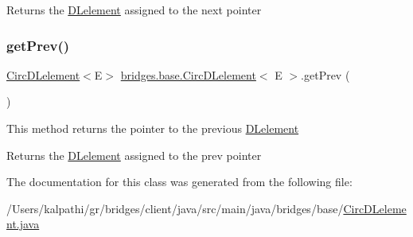 \begin{DoxyReturn}{Returns}
the \mbox{\hyperlink{classbridges_1_1base_1_1_d_lelement}{D\+Lelement}} assigned to the next pointer 
\end{DoxyReturn}
\mbox{\label{classbridges_1_1base_1_1_circ_d_lelement_aa2b83017a571694460f77dd31b4188ed}} 
\subsubsection{\texorpdfstring{get\+Prev()}{getPrev()}}
{\footnotesize\ttfamily \mbox{\hyperlink{classbridges_1_1base_1_1_circ_d_lelement}{Circ\+D\+Lelement}}$<$E$>$ \mbox{\hyperlink{classbridges_1_1base_1_1_circ_d_lelement}{bridges.\+base.\+Circ\+D\+Lelement}}$<$ E $>$.get\+Prev (\begin{DoxyParamCaption}{ }\end{DoxyParamCaption})}

This method returns the pointer to the previous \mbox{\hyperlink{classbridges_1_1base_1_1_d_lelement}{D\+Lelement}}

\begin{DoxyReturn}{Returns}
the \mbox{\hyperlink{classbridges_1_1base_1_1_d_lelement}{D\+Lelement}} assigned to the prev pointer 
\end{DoxyReturn}


The documentation for this class was generated from the following file\+:\begin{DoxyCompactItemize}
\item 
/\+Users/kalpathi/gr/bridges/client/java/src/main/java/bridges/base/\mbox{\hyperlink{_circ_d_lelement_8java}{Circ\+D\+Lelement.\+java}}\end{DoxyCompactItemize}
